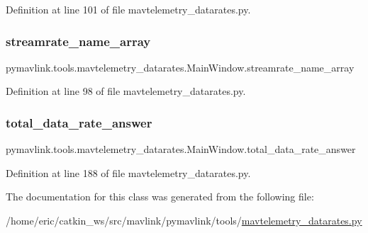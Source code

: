 Definition at line 101 of file mavtelemetry\+\_\+datarates.\+py.

\mbox{\label{classpymavlink_1_1tools_1_1mavtelemetry__datarates_1_1MainWindow_a85bc1c05549a1191cefc38487ccb6da9}} 
\subsubsection{\texorpdfstring{streamrate\_name\_array}{streamrate\_name\_array}}
{\footnotesize\ttfamily pymavlink.\+tools.\+mavtelemetry\+\_\+datarates.\+Main\+Window.\+streamrate\+\_\+name\+\_\+array}



Definition at line 98 of file mavtelemetry\+\_\+datarates.\+py.

\mbox{\label{classpymavlink_1_1tools_1_1mavtelemetry__datarates_1_1MainWindow_aba31501c3ddaf065302970566efaa7f3}} 
\subsubsection{\texorpdfstring{total\_data\_rate\_answer}{total\_data\_rate\_answer}}
{\footnotesize\ttfamily pymavlink.\+tools.\+mavtelemetry\+\_\+datarates.\+Main\+Window.\+total\+\_\+data\+\_\+rate\+\_\+answer}



Definition at line 188 of file mavtelemetry\+\_\+datarates.\+py.



The documentation for this class was generated from the following file\+:\begin{DoxyCompactItemize}
\item 
/home/eric/catkin\+\_\+ws/src/mavlink/pymavlink/tools/\mbox{\hyperlink{mavtelemetry__datarates_8py}{mavtelemetry\+\_\+datarates.\+py}}\end{DoxyCompactItemize}
